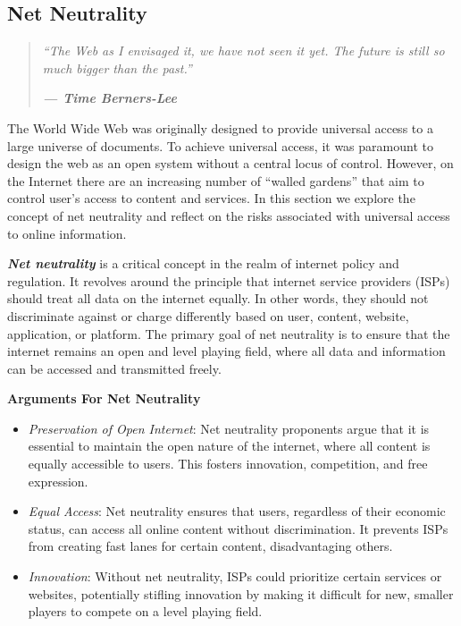\documentclass[
]{book}
\providecommand{\tightlist}{%
  \setlength{\itemsep}{0pt}\setlength{\parskip}{0pt}}
\theoremstyle{definition}
\theoremstyle{definition}
\theoremstyle{definition}
\theoremstyle{definition}
\theoremstyle{remark}
\begin{document}
\hypertarget{net-neutrality}{%
\subsection*{Net Neutrality}\label{net-neutrality}}

\begin{quote}
\emph{``The Web as I envisaged it, we have not seen it yet. The future is still so much bigger than the past.''}

\textbf{\emph{--- Time Berners-Lee}}
\end{quote}

The World Wide Web was originally designed to provide universal access to a large universe of documents. To achieve universal access, it was paramount to design the web as an open system without a central locus of control. However, on the Internet there are an increasing number of ``walled gardens'' that aim to control user's access to content and services. In this section we explore the concept of net neutrality and reflect on the risks associated with universal access to online information.

\textbf{\emph{Net neutrality}} is a critical concept in the realm of internet policy and regulation. It revolves around the principle that internet service providers (ISPs) should treat all data on the internet equally. In other words, they should not discriminate against or charge differently based on user, content, website, application, or platform. The primary goal of net neutrality is to ensure that the internet remains an open and level playing field, where all data and information can be accessed and transmitted freely.

\textbf{Arguments For Net Neutrality}

\begin{itemize}
\tightlist
\item
  \emph{Preservation of Open Internet}: Net neutrality proponents argue that it is essential to maintain the open nature of the internet, where all content is equally accessible to users. This fosters innovation, competition, and free expression.\\
\item
  \emph{Equal Access}: Net neutrality ensures that users, regardless of their economic status, can access all online content without discrimination. It prevents ISPs from creating fast lanes for certain content, disadvantaging others.\\
\item
  \emph{Innovation}: Without net neutrality, ISPs could prioritize certain services or websites, potentially stifling innovation by making it difficult for new, smaller players to compete on a level playing field.
\end{itemize}
\end{document}
